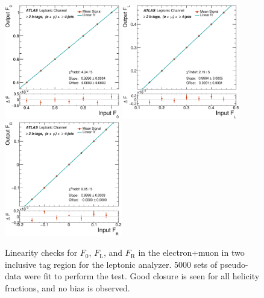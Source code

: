 \begin{figure}[htbp]
\begin{center}
		\includegraphics[height=50mm]{chapters/whel/figures/cali_curves_June-1-2017/Calicurve_F0_el_mu}
		\includegraphics[height=50mm]{chapters/whel/figures/cali_curves_June-1-2017/Calicurve_FL_el_mu}
		\includegraphics[height=50mm]{chapters/whel/figures/cali_curves_June-1-2017/Calicurve_FR_el_mu}
	\caption{Linearity checks for $F_{\text{0}}$, $F_{\text{L}}$, and $F_{\text{R}}$ in the electron+muon in two inclusive \bt tag region for the leptonic analyzer. 5000 sets of pseudo-data were fit to perform the test. Good closure is seen for all helicity fractions, and no bias is observed.}
	\label{fig:calibrationCurve_lephad}
\end{center}	
\end{figure}

